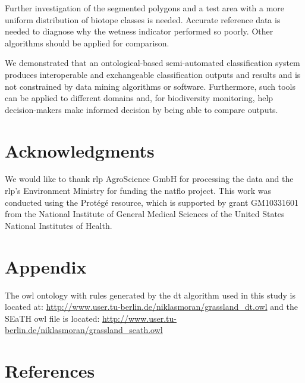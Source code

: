 \documentclass[authoryear,final,12pt,number]{elsarticle}
\begin{document}
Further investigation of the segmented polygons and a test area with a more
uniform distribution of biotope classes is needed. Accurate reference data is
needed to diagnose why the wetness indicator performed so poorly. Other 
algorithms should be applied for comparison.

We demonstrated that an ontological-based semi-automated classification system
produces interoperable and exchangeable classification outputs
and results and is not constrained by data mining
algorithms or software. Furthermore, such tools can be applied to different 
domains and, for biodiversity monitoring, help decision-makers make informed 
decision by being able to compare outputs.
\section{Acknowledgments}
We would like to thank \gls{rlp} AgroScience GmbH for processing the data and 
the \gls{rlp}'s Environment Ministry for funding the \gls{natflo} project. This 
work was conducted using the Prot\'eg\'e resource, which is supported by grant 
GM10331601 from the National Institute of General Medical Sciences of the 
United States National Institutes of Health.
\section{Appendix}
The \gls{owl} ontology with rules generated by the \gls{dt} algorithm used in 
this study is located at: 
\url{http://www.user.tu-berlin.de/niklasmoran/grassland_dt.owl} and the SEaTH 
\gls{owl} file is located: 
\url{http://www.user.tu-berlin.de/niklasmoran/grassland_seath.owl}

\section{References}

\end{document}
